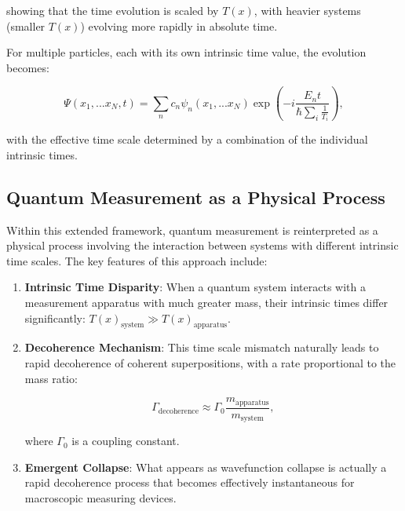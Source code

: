 \documentclass[12pt,a4paper]{article}
\newcommand{\Tfield}{T(x)}
\begin{document}
	showing that the time evolution is scaled by $\Tfield$, with heavier systems (smaller $\Tfield$) evolving more rapidly in absolute time.
	
	For multiple particles, each with its own intrinsic time value, the evolution becomes:
	
	\begin{equation}
		\Psi(x_1,...x_N,t) = \sum_n c_n \psi_n(x_1,...x_N) \exp\left(-i\frac{E_n t}{\hbar \sum_i \frac{1}{T_i}}\right),
		\label{eq:multi_particle}
	\end{equation}
	
	with the effective time scale determined by a combination of the individual intrinsic times.
	
	\subsection{Quantum Measurement as a Physical Process}
	\label{subsec:quantum_measurement}
	
	Within this extended framework, quantum measurement is reinterpreted as a physical process involving the interaction between systems with different intrinsic time scales. The key features of this approach include:
	
	\begin{enumerate}
		\item \textbf{Intrinsic Time Disparity}: When a quantum system interacts with a measurement apparatus with much greater mass, their intrinsic times differ significantly: $\Tfield_{\text{system}} \gg \Tfield_{\text{apparatus}}$.
		
		\item \textbf{Decoherence Mechanism}: This time scale mismatch naturally leads to rapid decoherence of coherent superpositions, with a rate proportional to the mass ratio:
		
		\begin{equation}
			\Gamma_{\text{decoherence}} \approx \Gamma_0 \frac{m_{\text{apparatus}}}{m_{\text{system}}},
			\label{eq:decoherence_rate}
		\end{equation}
		
		where $\Gamma_0$ is a coupling constant.
		
		\item \textbf{Emergent Collapse}: What appears as wavefunction collapse is actually a rapid decoherence process that becomes effectively instantaneous for macroscopic measuring devices.
	\end{enumerate}
	
\end{document}
